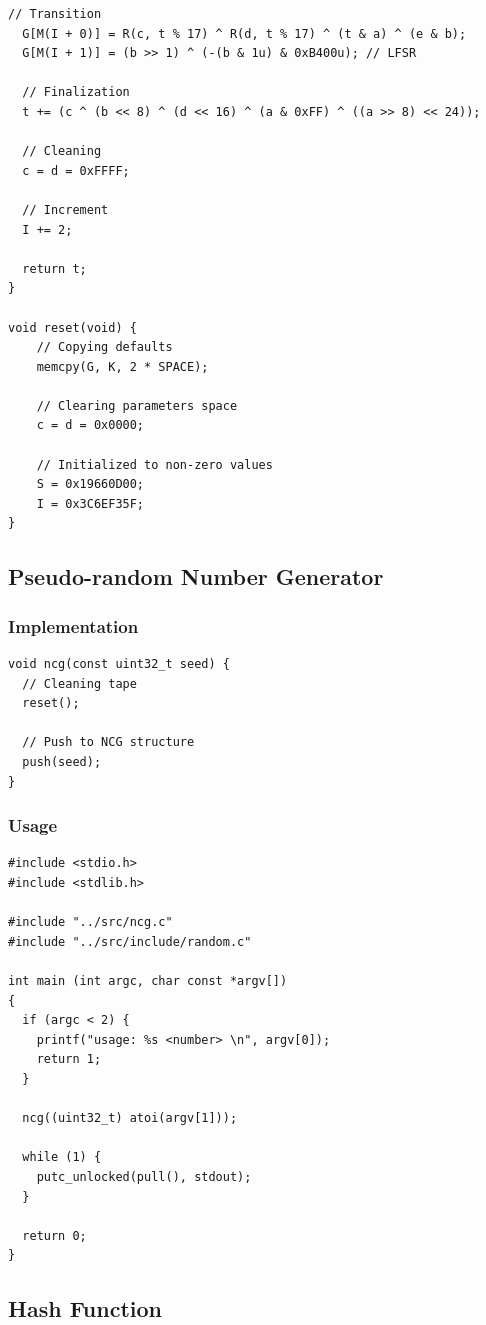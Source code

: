 \documentclass[twocolumn, a4paper, 10pt]{article}
\begin{document}
\begin{lstlisting}[style=codeAppendix]
  // Transition
  G[M(I + 0)] = R(c, t % 17) ^ R(d, t % 17) ^ (t & a) ^ (e & b);
  G[M(I + 1)] = (b >> 1) ^ (-(b & 1u) & 0xB400u); // LFSR

  // Finalization
  t += (c ^ (b << 8) ^ (d << 16) ^ (a & 0xFF) ^ ((a >> 8) << 24));

  // Cleaning
  c = d = 0xFFFF;

  // Increment
  I += 2;

  return t;
}

void reset(void) {
	// Copying defaults
	memcpy(G, K, 2 * SPACE);

	// Clearing parameters space
	c = d = 0x0000;

	// Initialized to non-zero values
	S = 0x19660D00;
	I = 0x3C6EF35F;
}
\end{lstlisting}

\subsection{Pseudo-random Number Generator}

\subsubsection{Implementation}

\begin{lstlisting}[style=codeAppendix]
void ncg(const uint32_t seed) {
  // Cleaning tape
  reset();

  // Push to NCG structure
  push(seed);
}
\end{lstlisting}

\subsubsection{Usage}

\begin{lstlisting}[style=codeAppendix]
#include <stdio.h>
#include <stdlib.h>

#include "../src/ncg.c"
#include "../src/include/random.c"

int main (int argc, char const *argv[])
{
  if (argc < 2) {
    printf("usage: %s <number> \n", argv[0]);
    return 1;
  }

  ncg((uint32_t) atoi(argv[1]));

  while (1) {
    putc_unlocked(pull(), stdout);
  }

  return 0;
}
\end{lstlisting}

\subsection{Hash Function}
\end{document}
